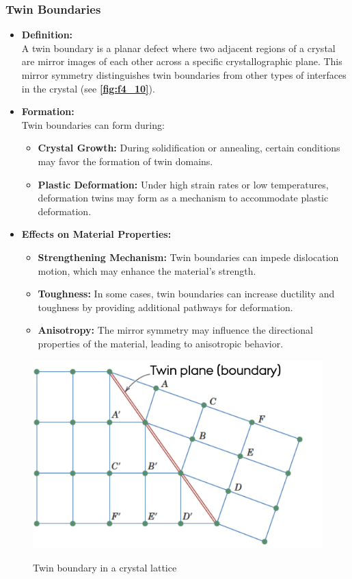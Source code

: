 \subsubsection{Twin Boundaries}
\begin{itemize}
  \item \textbf{Definition:} \\
    A twin boundary is a planar defect where two adjacent regions of a crystal are mirror images of each other across a specific crystallographic plane. This mirror symmetry distinguishes twin boundaries from other types of interfaces in the crystal (see \textbf{\autoref{fig:f4_10}}).
  \item \textbf{Formation:} \\
    Twin boundaries can form during:
    \begin{itemize}
      \item \textbf{Crystal Growth:} During solidification or annealing, certain conditions may favor the formation of twin domains.
      \item \textbf{Plastic Deformation:} Under high strain rates or low temperatures, deformation twins may form as a mechanism to accommodate plastic deformation.
    \end{itemize}
  \item \textbf{Effects on Material Properties:}
    \begin{itemize}
      \item \textbf{Strengthening Mechanism:} Twin boundaries can impede dislocation motion, which may enhance the material’s strength.
      \item \textbf{Toughness:} In some cases, twin boundaries can increase ductility and toughness by providing additional pathways for deformation.
      \item \textbf{Anisotropy:} The mirror symmetry may influence the directional properties of the material, leading to anisotropic behavior.
    \end{itemize}
\end{itemize}

\begin{figure}[ht]
  \centering
  \caption{Twin boundary in a crystal lattice}
  \includegraphics[width=0.45\linewidth]{./figures/f4_10.png}
  \label{fig:f4_10}
\end{figure}



